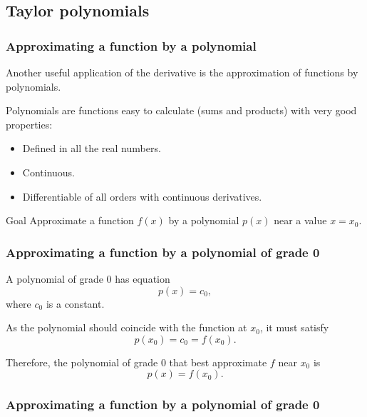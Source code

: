 \subsection{Taylor polynomials}
\begin{frame}
\frametitle{Approximating a function by a polynomial}
Another useful application of the derivative is the approximation of functions by polynomials.

Polynomials are functions easy to calculate (sums and products) with very good properties:
\begin{itemize}
\item Defined in all the real numbers.
\item Continuous.
\item Differentiable of all orders with continuous derivatives.
\end{itemize}

\begin{block}{Goal}
Approximate a function $f(x)$ by a polynomial $p(x)$ near a value $x=x_0$.
\end{block}
\end{frame}


\begin{frame}
\frametitle{Approximating a function by a polynomial of grade 0}
A polynomial of grade 0 has equation
\[
p(x) = c_0,
\]
where $c_0$ is a constant.

As the polynomial should coincide with the function at $x_0$, it must satisfy
\[p(x_0) = c_0 = f(x_0).\]

Therefore, the polynomial of grade 0 that best approximate $f$ near $x_0$ is
\[p(x) = f(x_0).\]
\end{frame}


\begin{frame}
\frametitle{Approximating a function by a polynomial of grade 0}
\begin{center}

\end{center}
\end{frame}


